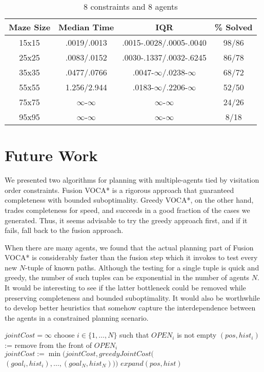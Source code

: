 \documentclass[letterpaper]{article}
\begin{document}
\begin{table}
\centering
\begin{tabular} {|c|c|c|c|} \hline
Maze Size & Median Time & IQR & \% Solved \\ \hline
15x15 & .0019/.0013 & .0015-.0028/.0005-.0040 & 98/86 \\ \hline
25x25 & .0083/.0152 & .0030-.1337/.0032-.6245 & 86/78 \\ \hline
35x35 & .0477/.0766 & .0047-$\infty$/.0238-$\infty$ & 68/72 \\ \hline
55x55 & 1.256/2.944 & .0183-$\infty$/.2206-$\infty$ & 52/50 \\ \hline
75x75 & $\infty$-$\infty$ & $\infty$-$\infty$ & 24/26 \\ \hline
95x95 & $\infty$-$\infty$ & $\infty$-$\infty$ & 8/18 \\ \hline
\end{tabular}
\caption{8 constraints and 8 agents}
\label{tab:rows}
\end{table}

\section{Future Work}

We presented two algorithms for planning with multiple-agents tied by visitation order constraints. Fusion VOCA* is a rigorous approach that guaranteed completeness with bounded suboptimality. Greedy VOCA*, on the other hand, trades completeness for speed, and succeeds in a good fraction of the cases we generated. Thus, it seems advisable to try the greedy approach first, and if it fails, fall back to the fusion approach.

When there are many agents, we found that the actual planning part of Fusion VOCA* is considerably faster than the fusion step which it invokes to test every new $N$-tuple of known paths. Although the testing for a single tuple is quick and greedy, the number of such tuples can be exponential in the number of agents $N$. It would be interesting to see if the latter bottleneck could be removed while preserving completeness and bounded suboptimality.  It would also be worthwhile to develop better heuristics that somehow capture the interdependence between the agents in a constrained planning scenario.

\begin{algorithm}
\caption{$Fusion VOCA*$}
\label{alg:update}
\begin{algorithmic}
\STATE $jointCost = \infty$
\STATE choose $i\in\{1,\ldots,N\}$ such that $OPEN_{i}$ is not empty
\STATE $(pos, hist_i)$ := remove from the front of $OPEN_{i}$
\STATE $jointCost := \min(jointCost,greedyJointCost($\\\qquad$(goal_i,hist_i),\ldots,(goal_N,hist_N)))$
\ENDFOR
\ENDIF
\STATE $expand(pos, hist)$
\ENDWHILE
\end{algorithmic}
\end{algorithm}
\end{document}
